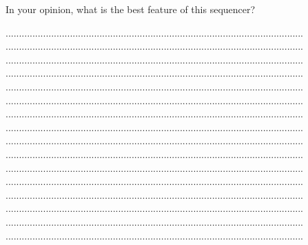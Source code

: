 \documentclass[12pt]{article}
\numberwithin{subsubsubsection}{subsubsection}
\begin{document}
\begin{enumerate}
\newpage

In your opinion, what is the best feature of this sequencer?

...............................................................................................................\\
...............................................................................................................\\
...............................................................................................................\\
...............................................................................................................\\
...............................................................................................................\\
...............................................................................................................\\
...............................................................................................................\\
...............................................................................................................\\
...............................................................................................................\\
...............................................................................................................\\
...............................................................................................................\\
...............................................................................................................\\
...............................................................................................................\\
...............................................................................................................\\
...............................................................................................................\\
...............................................................................................................\\






\end{enumerate}
\end{document}
